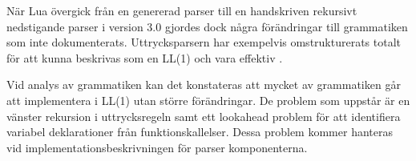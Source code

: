 När Lua övergick från en genererad parser till en handskriven rekursivt
nedstigande parser i version 3.0 \citep{luaimp} gjordes dock några
förändringar till grammatiken som inte dokumenterats. Uttrycksparsern har
exempelvis omstrukturerats totalt för att kunna beskrivas som en LL(1) och
vara effektiv \citep[s. 175]{bf09}.

Vid analys av grammatiken kan det konstateras att mycket av grammatiken går att
implementera i LL(1) utan större förändringar. De problem som uppstår är en
vänster rekursion i uttrycksregeln samt ett lookahead problem för att
identifiera variabel deklarationer från funktionskallelser. Dessa problem
kommer hanteras vid implementationsbeskrivningen för parser komponenterna.

